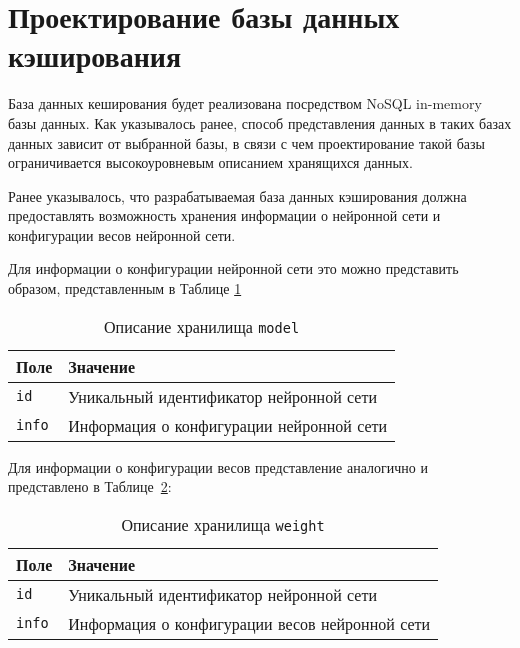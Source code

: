 \section{Проектирование базы данных кэширования}

База данных кеширования будет реализована посредством NoSQL in-memory базы данных. Как указывалось ранее, способ представления данных в таких базах данных зависит от выбранной базы, в связи с чем проектирование такой базы ограничивается высокоуровневым описанием хранящихся данных.

Ранее указывалось, что разрабатываемая база данных кэширования должна предоставлять возможность хранения информации о нейронной сети и конфигурации весов нейронной сети.

Для информации о конфигурации нейронной сети это можно представить образом, представленным в Таблице \ref{tbl:memcache}

\begin{table}[!ht]
    \caption{Описание хранилища \texttt{model}}
    \begin{center}
        \label{tbl:memcache}
        \begin{tabular}{|p{}|p{}|}
            \hline
            \textbf{Поле} & \textbf{Значение} \\\hline
            \texttt{id} & Уникальный идентификатор нейронной сети \\\hline
            \texttt{info} & Информация о конфигурации нейронной сети \\\hline
        \end{tabular}
    \end{center}
\end{table}

Для информации о конфигурации весов представление аналогично и представлено в Таблице~\ref{tbl:memcachew}:

\begin{table}[!ht]
    \caption{Описание хранилища \texttt{weight}}
    \begin{center}
        \label{tbl:memcachew}
        \begin{tabular}{|p{}|p{}|}
            \hline
            \textbf{Поле} & \textbf{Значение} \\\hline
            \texttt{id} & Уникальный идентификатор нейронной сети \\\hline
            \texttt{info} & Информация о конфигурации весов нейронной сети \\\hline
        \end{tabular}
    \end{center}
\end{table}

